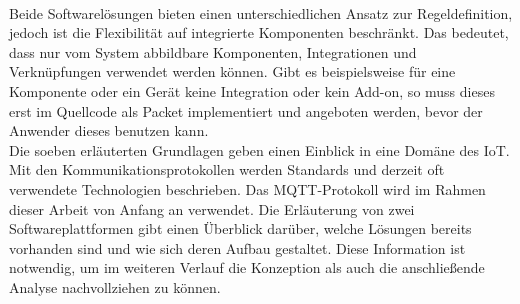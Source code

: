     \\
    Beide Softwarelösungen bieten einen unterschiedlichen Ansatz zur Regeldefinition, jedoch ist die Flexibilität 
    auf integrierte Komponenten beschränkt. Das bedeutet, dass nur vom System abbildbare Komponenten, 
    Integrationen und Verknüpfungen verwendet werden können. Gibt es beispielsweise für eine Komponente oder ein Gerät keine 
    Integration oder kein Add-on, so muss dieses erst im Quellcode als Packet implementiert und angeboten werden, bevor der 
    Anwender dieses benutzen kann. 
    \\
    \linebreak
    Die soeben erläuterten Grundlagen geben einen Einblick in eine Domäne des \acs{IoT}. Mit den Kommunikationsprotokollen werden Standards 
    und derzeit oft verwendete Technologien beschrieben. Das \acs{MQTT}-Protokoll wird im Rahmen dieser Arbeit von Anfang an verwendet. 
    Die Erläuterung von zwei Softwareplattformen gibt einen Überblick 
    darüber, welche Lösungen bereits vorhanden sind und wie sich deren Aufbau gestaltet. Diese Information ist notwendig, um im 
    weiteren Verlauf die Konzeption als auch die anschließende Analyse nachvollziehen zu können.

 